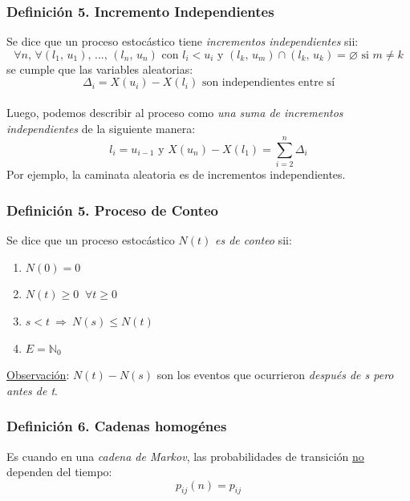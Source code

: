 \documentclass{article}
\newcommand{\comma}{,\,}                                %
\newcommand{\naturales}{\mathbb{N}}                     %
\newcommand{\Rightarrows}{\: \Rightarrow \:}            %
\newcommand{\sumatoria}[2]{\sum_{#1} ^{#2}}
\begin{document}
\subsubsection*{Definición 5. Incremento Independientes}
Se dice que un proceso estocástico tiene \emph{incrementos independientes} sii:
\begin{equation*}
    \forall n \comma \forall (l_1 \comma u_1) \comma ... \comma (l_n \comma u_n) \text{ con } l_i < u_i \text{ y } (l_k \comma u_m) \cap (l_k \comma u_k) = \varnothing \text{ si } m \neq k
\end{equation*}
se cumple que las variables aleatorias: 
\begin{equation*}
    \Delta_i = X(u_i) - X(l_i) \text{ son independientes entre sí}
\end{equation*}
\\Luego, podemos describir al proceso como \emph{una suma de incrementos independientes} de la siguiente manera:
\begin{equation*}
    l_i = u_{i-1} \text{ y } X(u_n) - X(l_1) = \sumatoria{i = 2}{n} \Delta_i
\end{equation*}
Por ejemplo, la caminata aleatoria es de incrementos independientes.

\subsubsection*{Definición 5. Proceso de Conteo}
Se dice que un proceso estocástico $N(t)$ \emph{es de conteo} sii: 
\begin{enumerate}
    \item $N(0) = 0$
    \item $N(t) \geq 0 \;\; \forall t \geq 0$
    \item $s < t \Rightarrows N(s) \leq N(t)$
    \item $E = \naturales_0$
\end{enumerate}
\underline{Observación}: $N(t) - N(s)$ son los eventos que ocurrieron \emph{después de s pero antes de t}.

\subsubsection*{Definición 6. Cadenas homogénes}
Es cuando en una \emph{cadena de Markov}, las probabilidades de transición \underline{no} dependen del tiempo:
\begin{equation*}
    p_{ij}(n) = p_{ij}
\end{equation*}
\end{document}
